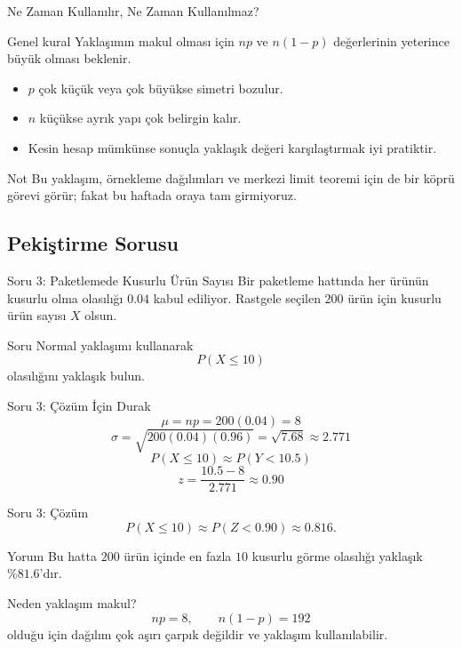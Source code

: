 \documentclass[light]{lutbeamer}
\begin{document}
\begin{frame}{Ne Zaman Kullanılır, Ne Zaman Kullanılmaz?}
    \small
    \begin{block}{Genel kural}
        Yaklaşımın makul olması için \(np\) ve \(n(1-p)\) değerlerinin yeterince büyük olması beklenir.
    \end{block}

    \begin{itemize}
        \item \(p\) çok küçük veya çok büyükse simetri bozulur.
        \item \(n\) küçükse ayrık yapı çok belirgin kalır.
        \item Kesin hesap mümkünse sonuçla yaklaşık değeri karşılaştırmak iyi pratiktir.
    \end{itemize}

    \begin{alertblock}{Not}
        Bu yaklaşım, örnekleme dağılımları ve merkezi limit teoremi için de bir köprü görevi görür; fakat bu haftada oraya tam girmiyoruz.
    \end{alertblock}
\end{frame}

\subsection{Pekiştirme Sorusu}

\begin{frame}{Soru 3: Paketlemede Kusurlu Ürün Sayısı}
    \small
    Bir paketleme hattında her ürünün kusurlu olma olasılığı \(0.04\) kabul ediliyor. Rastgele seçilen \(200\) ürün için kusurlu ürün sayısı \(X\) olsun.

    \begin{block}{Soru}
        Normal yaklaşımı kullanarak
        \[
        P(X\le 10)
        \]
        olasılığını yaklaşık bulun.
    \end{block}
\end{frame}

\begin{frame}{Soru 3: Çözüm İçin Durak}
    \color{red!70!black}
    \small
    \[
    \mu=np=200(0.04)=8
    \]
    \[
    \sigma=\sqrt{200(0.04)(0.96)}=\sqrt{7.68}\approx 2.771
    \]
    \[
    P(X\le 10)\approx P(Y<10.5)
    \]
    \[
    z=\frac{10.5-8}{2.771}\approx 0.90
    \]
\end{frame}

\begin{frame}{Soru 3: Çözüm}
    \small
    \[
    P(X\le 10)\approx P(Z<0.90)\approx 0.816.
    \]

    \begin{exampleblock}{Yorum}
        Bu hatta \(200\) ürün içinde en fazla \(10\) kusurlu görme olasılığı yaklaşık \(\%81.6\)'dır.
    \end{exampleblock}

    \begin{alertblock}{Neden yaklaşım makul?}
        \[
        np=8, \qquad n(1-p)=192
        \]
        olduğu için dağılım çok aşırı çarpık değildir ve yaklaşım kullanılabilir.
    \end{alertblock}
\end{frame}
\end{document}
